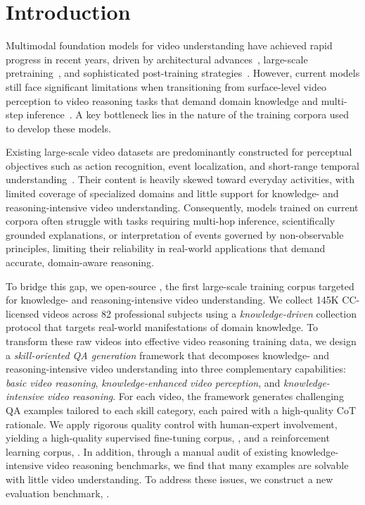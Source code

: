 
\section{Introduction}
\label{sec:intro}
Multimodal foundation models for video understanding have achieved rapid progress in recent years, driven by architectural advances~\cite{shu2025video, zohar2025apollo, ren2025vamba, li2024unimoescalingunifiedmultimodal, 11353361}, large-scale pretraining~\cite{Zhang2025VideoLLaMA3F, Wang2025InternVideo25EV, Qwen2.5-VL, chen2025eagle}, and sophisticated post-training strategies~\cite{videor1, Open-o3, videorft, videochatr1, li2025veripocultivatinglongreasoning}. However,  current models still face significant limitations when transitioning from surface-level video perception to video reasoning tasks that demand domain knowledge and multi-step inference~\cite{mmvu, videommmu, scivideobench, song2025video}.
A key bottleneck lies in the nature of the training corpora used to develop these models. 

Existing large-scale video datasets are predominantly constructed for perceptual objectives such as action recognition, event localization, and short-range temporal understanding~\cite{videor1, videorft, Open-o3, TVGR1, scaling}. Their content is heavily skewed toward everyday activities, with limited coverage of specialized domains and little support for knowledge- and reasoning-intensive video understanding.
Consequently, models trained on current corpora often struggle with tasks requiring multi-hop inference, scientifically grounded explanations, or interpretation of events governed by non-observable principles, limiting their reliability in real-world applications that demand accurate, domain-aware reasoning.

To bridge this gap, we open-source \data, the first large-scale training corpus targeted for knowledge- and reasoning-intensive video understanding. 
We collect 145K CC-licensed videos across 82 professional subjects using a \emph{knowledge-driven} collection protocol that targets real-world manifestations of domain knowledge.
To transform these raw videos into effective video reasoning training data, we design a \emph{skill-oriented QA generation} framework that decomposes knowledge- and reasoning-intensive video understanding into three complementary capabilities: \emph{basic video reasoning}, \emph{knowledge-enhanced video perception}, and \emph{knowledge-intensive video reasoning}. For each video, the framework generates challenging QA examples tailored to each skill category, each paired with a high-quality CoT rationale.
We apply rigorous quality control with human-expert involvement, yielding a high-quality supervised fine-tuning corpus, \sftdata, and a reinforcement learning corpus, \rldata.
In addition, through a manual audit of existing knowledge-intensive video reasoning benchmarks, we find that many examples are solvable with little video understanding. To address these issues, we construct a new evaluation benchmark, \eval.









